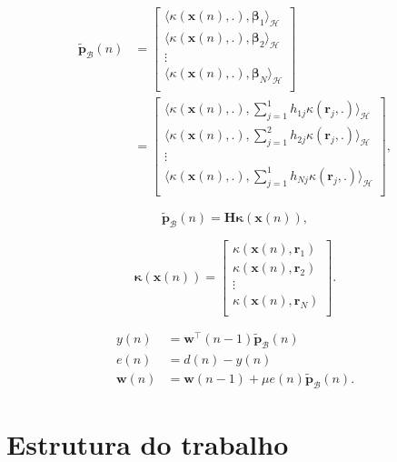 \begin{align}
    \tilde{\mathbf{p}}_\mathcal{B}(n) &= \begin{bmatrix}
        \langle\kappa(\mathbf{x}(n),.),\boldsymbol{\beta}_1\rangle_\mathcal{H}\\
        \langle\kappa(\mathbf{x}(n),.),\boldsymbol{\beta}_2\rangle_\mathcal{H}\\
        \vdots\\
        \langle\kappa(\mathbf{x}(n),.),\boldsymbol{\beta}_N\rangle_\mathcal{H}\\
    \end{bmatrix} \\&= \begin{bmatrix}
        \langle\kappa(\mathbf{x}(n),.),\sum_{j=1}^{1}h_{1j}\kappa(\mathbf{r}_j,.)\rangle_\mathcal{H}\\
        \langle\kappa(\mathbf{x}(n),.),\sum_{j=1}^{2}h_{2j}\kappa(\mathbf{r}_j,.)\rangle_\mathcal{H}\\
        \vdots\\
        \langle\kappa(\mathbf{x}(n),.),\sum_{j=1}^{1}h_{Nj}\kappa(\mathbf{r}_j,.)\rangle_\mathcal{H}\\
    \end{bmatrix},      
\end{align}

\begin{equation}
    \tilde{\mathbf{p}}_{\mathcal{B}}(n) =\mathbf{H}\boldsymbol{\kappa}(\mathbf{x}(n)),
\end{equation}

\begin{equation}
    \boldsymbol{\kappa}(\mathbf{x}(n)) = \begin{bmatrix}
        \kappa(\mathbf{x}(n),\mathbf{r}_1)\\
        \kappa(\mathbf{x}(n),\mathbf{r}_2)\\
        \vdots\\
        \kappa(\mathbf{x}(n),\mathbf{r}_N)\\
    \end{bmatrix}.      
\end{equation}

\begin{align}
    y(n) &= \mathbf{w}^{\top}(n-1)\tilde{\mathbf{p}}_{\mathcal{B}}(n)\\
    e(n) &= d(n) - y(n)\\
    \mathbf{w}(n) &= \mathbf{w}(n-1) + \mu e(n)\tilde{\mathbf{p}}_{\mathcal{B}}(n).
\end{align}

\section{Estrutura do trabalho}